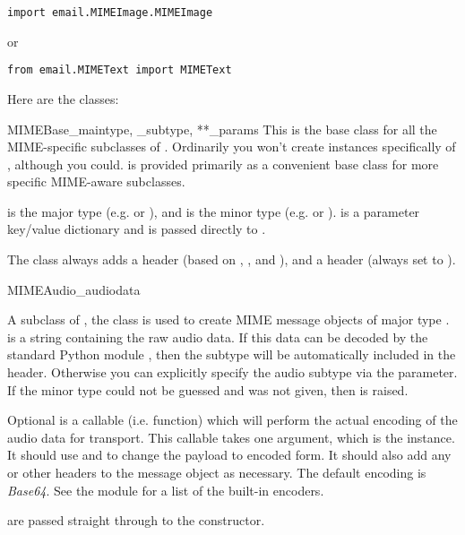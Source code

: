 \begin{verbatim}
import email.MIMEImage.MIMEImage
\end{verbatim}

or

\begin{verbatim}
from email.MIMEText import MIMEText
\end{verbatim}

Here are the classes:

\begin{classdesc}{MIMEBase}{_maintype, _subtype, **_params}
This is the base class for all the MIME-specific subclasses of
.  Ordinarily you won't create instances specifically
of , although you could.   is provided
primarily as a convenient base class for more specific MIME-aware
subclasses.

 is the  major type
(e.g.  or ), and  is the
 minor type 
(e.g.  or ).   is a parameter
key/value dictionary and is passed directly to
.

The  class always adds a  header
(based on , , and ), and a
 header (always set to ).
\end{classdesc}

\begin{classdesc}{MIMEAudio}{_audiodata}

A subclass of , the  class is used to
create MIME message objects of major type .
 is a string containing the raw audio data.  If this
data can be decoded by the standard Python module ,
then the subtype will be automatically included in the
 header.  Otherwise you can explicitly specify the
audio subtype via the  parameter.  If the minor type could
not be guessed and  was not given, then 
is raised.

Optional  is a callable (i.e. function) which will
perform the actual encoding of the audio data for transport.  This
callable takes one argument, which is the  instance.
It should use  and  to
change the payload to encoded form.  It should also add any
 or other headers to the message
object as necessary.  The default encoding is \emph{Base64}.  See the
 module for a list of the built-in encoders.

 are passed straight through to the 
constructor.
\end{classdesc}

